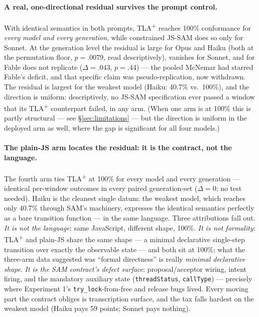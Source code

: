 \documentclass[11pt]{article}
\newcommand{\jssam}{JS-SAM}
\newcommand{\tlaplus}{TLA\texorpdfstring{\textsuperscript{+}}{+}}
\begin{document}
\paragraph{A real, one-directional residual survives the prompt control.}
With identical semantics in both prompts, \tlaplus{} reaches 100\%
conformance for \emph{every model and every generation}, while constrained
\jssam{} does so only for Sonnet. At the generation level the residual is
large for Opus and Haiku (both at the permutation floor,
$p{=}.0079$, read descriptively), vanishes for Sonnet, and for Fable does
not replicate
($\Delta{=}.043$, $p{=}.44$) --- the pooled McNemar had starred Fable's
deficit, and that specific claim was pseudo-replication, now withdrawn. The
residual is largest for the weakest model (Haiku: 40.7\% vs.\ 100\%), and
the direction is uniform: descriptively, no \jssam{} specification ever
passed a window that its \tlaplus{} counterpart failed, in any arm. (When
one arm is at 100\% this is partly structural --- see
\S\ref{sec:limitations} --- but the direction is uniform in the deployed arm
as well, where the gap is significant for all four models.)

\paragraph{The plain-JS arm locates the residual: it is the contract, not
the language.}
The fourth arm ties \tlaplus{} at 100\% for every model and every generation
--- identical per-window outcomes in every paired generation-set
($\Delta{=}0$; no test needed). Haiku is the cleanest single datum:
the weakest model, which reaches only 40.7\% through SAM's machinery,
expresses the identical semantics perfectly as a bare transition function
--- in the same language. Three attributions fall out.
\emph{It is not the language}: same JavaScript, different shape, 100\%.
\emph{It is not formality}: \tlaplus{} and plain-JS share the same shape ---
a minimal declarative single-step transition over exactly the observable
state --- and both sit at 100\%; what the three-arm data suggested was
``formal directness'' is really \emph{minimal declarative shape}.
\emph{It is the SAM contract's defect surface}: proposal/acceptor wiring,
intent firing, and the mandatory auxiliary state
(\texttt{threadStatus}, \texttt{callType}) --- precisely where
Experiment 1's \texttt{try\_lock}-from-free and release bugs lived. Every
moving part the contract obliges is transcription surface, and the tax falls
hardest on the weakest model (Haiku pays 59 points; Sonnet pays nothing).
\end{document}
